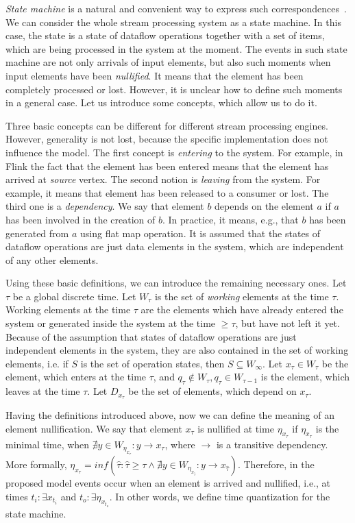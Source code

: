 \documentclass[sigconf]{acmart}
\theoremstyle{remark}
\begin{document}
{\em State machine} is a natural and convenient way to express such correspondences~\cite{ссыль}. We can consider the whole stream processing system as a state machine. In this case, the state is a state of dataflow operations together with a set of items, which are being processed in the system at the moment. The events in such state machine are not only arrivals of input elements, but also such moments when input elements have been {\em nullified}. It means that the element has been completely processed or lost. However, it is unclear how to define such moments in a general case. Let us introduce some concepts, which allow us to do it.

Three basic concepts can be different for different stream processing engines. However, generality is not lost, because the specific implementation does not influence the model. The first concept is {\em entering} to the system. For example, in Flink the fact that the element has been entered means that the element has arrived at {\em source} vertex. The second notion is {\em leaving} from the system. For example, it means that element has been released to a consumer or lost. The third one is a {\em dependency}. We say that element $b$ depends on the element $a$ if $a$ has been involved in the creation of $b$. In practice, it means, e.g., that $b$ has been generated from $a$ using flat map operation. It is assumed that the states of dataflow operations are just data elements in the system, which are independent of any other elements.

Using these basic definitions, we can introduce the remaining necessary ones. Let $\tau$ be a global discrete time. Let $W_\tau$ is the set of {\em working} elements at the time $\tau$. Working elements at the time $\tau$ are the elements which have already entered the system or generated inside the system at the time $\geqslant{\tau}$, but have not left it yet. Because of the assumption that states of dataflow operations are just independent elements in the system, they are also contained in the set of working elements, i.e. if $S$ is the set of operation states, then $S\subseteq{W_\infty}$. Let $x_\tau\in{W_\tau}$ be the element, which enters at the time $\tau$, and $q_\tau\notin{W_\tau},q_\tau\in{W_{\tau-1}}$ is the element, which leaves at the time $\tau$. Let $D_{x_{\tau}}$ be the set of elements, which depend on $x_\tau$.

Having the definitions introduced above, now we can define the meaning of an element nullification. We say that element $x_\tau$ is nullified at time $\eta_{x_{\tau}}$ if $\eta_{x_{\tau}}$ is the minimal time, when $\nexists{y\in{W_{\eta_{x_{\tau}}}}}:{y}\to{x_{\tau}}$, where $\to$ is a transitive dependency. More formally, $\eta_{x_{\tau}} = inf(\hat{\tau}:\hat{\tau}\geqslant{\tau}\land{\nexists{y\in{W_{\eta_{x_{\hat{\tau}}}}}}:{y}\to{x_{\hat{\tau}}}})$. Therefore, in the proposed model events occur when an element is arrived and nullified, i.e., at times $t_i:\exists{x_{t_i}}$ and $t_o:\exists{\eta_{x_{t_o}}}$. In other words, we define time quantization for the state machine.
\end{document}
